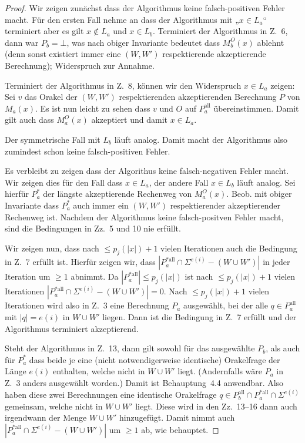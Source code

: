 \documentclass[nofonts]{uebung}
\theoremstyle{definition}
\begin{document}
\begin{proof}
Wir zeigen zunächst dass der Algorithmus keine falsch-positiven Fehler macht.
Für den ersten Fall nehme an dass der Algorithmus mit „$x\in L_a$“ terminiert aber es gilt $x\not\in L_a$ und $x\in L_b$.
Terminiert der Algorithmus in Z.~6, dann war $P_b=\bot$, was nach obiger Invariante bedeutet dass $M_b^O(x)$ ablehnt (denn sonst existiert immer eine $(W, W')$ respektierende akzeptierende Berechnung); Widerspruch zur Annahme.

Terminiert der Algorithmus in Z.~8, können wir den Widerspruch $x\in L_a$ zeigen: Sei $v$ das Orakel der $(W, W')$ respektierenden akzeptierenden Berechnung $P$ von $M_a(x)$. Es ist nun leicht zu sehen dass $v$ und $O$ auf $P_a^\mathrm{all}$ übereinstimmen. Damit gilt auch dass $M_a^O(x)$ akzeptiert und damit $x\in L_a$.

Der symmetrische Fall mit $L_b$ läuft analog. Damit macht der Algorithmus also zumindest schon keine falsch-positiven Fehler.
\medskip

Es verbleibt zu zeigen dass der Algorithus keine falsch-negativen Fehler macht.
Wir zeigen dies für den Fall dass $x\in L_a$, der andere Fall $x\in L_b$ läuft analog.
Sei hierfür $P_a^*$ der längste akzeptierende Rechenweg von $M_a^O(x)$.
Beob. mit obiger Invariante dass $P_a^*$ auch immer ein $(W,W')$ respektierender akzeptierender Rechenweg ist.
Nachdem der Algorithmus keine falsch-positven Fehler macht, sind die Bedingungen in Zz.~5 und 10 nie erfüllt.

Wir zeigen nun, dass nach $\leq p_j(|x|)+1$ vielen Iterationen auch die Bedingung in Z.~7 erfüllt ist.
Hierfür zeigen wir, dass $|P_a^{*\mathrm{all}}\cap \Sigma^{e(i)}-(W\cup W')|$ in jeder Iteration um $\geq 1$ abnimmt. Da $|P_a^{*\mathrm{all}}|\leq p_j(|x|)$ ist nach $\leq p_j(|x|)+1$ vielen Iterationen $|P_a^{*\mathrm{all}}\cap \Sigma^{e(i)}-(W\cup W')|=0$.
Nach $\leq p_j(|x|)+1$ vielen Iterationen wird also in Z.~3 eine Berechnung $P_a$ ausgewählt, bei der alle $q\in P_a^{\mathrm{all}}$ mit $|q|=e(i)$ in $W\cup W'$ liegen. Dann ist die Bedingung in Z.~7 erfüllt und der Algorithmus terminiert akzeptierend.

Steht der Algorithmus in Z.~13, dann gilt sowohl für das ausgewählte $P_b$, als auch für $P_a^*$ dass beide je eine (nicht notwendigerweise identische) Orakelfrage der Länge $e(i)$ enthalten, welche nicht in $W\cup W'$ liegt. (Andernfalls  wäre $P_a$ in Z.~3 anders ausgewählt worden.)
Damit ist Behauptung~4.4 anwendbar. Also haben diese zwei Berechnungen eine identische Orakelfrage $q\in P_b^\mathrm{all}\cap P_a^{*\mathrm{all}}\cap \Sigma^{e(i)}$ gemeinsam, welche nicht in $W\cup W'$ liegt.
Diese wird in den Zz.~13--16 dann auch irgendwann der Menge $W\cup W'$ hinzugefügt.
Damit nimmt auch $|P_a^{*\mathrm{all}}\cap \Sigma^{e(i)}-(W\cup W')|$ um $\geq 1$ ab, wie behauptet.
\end{proof}
\end{document}
